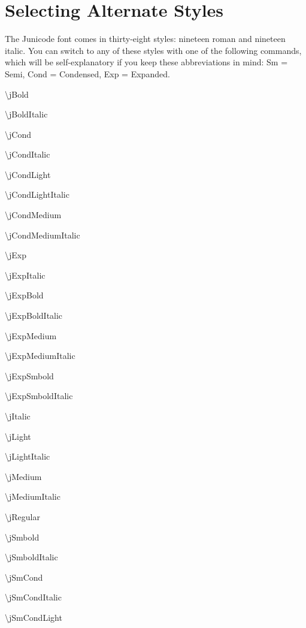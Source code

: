 \documentclass{article}
\begin{document}
\section{Selecting Alternate Styles}

The Junicode font comes in thirty-eight styles: nineteen roman and nineteen italic. You can
switch to any of these styles with one of the following commands, which will be self-explanatory
if you keep these abbreviations in mind: Sm = Semi, Cond = Condensed, Exp = Expanded.

\begin{multicols}{3}
    \jCond\textbackslash jBold

    \textbackslash jBoldItalic
    
    \textbackslash jCond
    
    \textbackslash jCondItalic
    
    \textbackslash jCondLight
    
    \textbackslash jCondLightItalic
    
    \textbackslash jCondMedium
    
    \textbackslash jCondMediumItalic
    
    \textbackslash jExp
    
    \textbackslash jExpItalic
    
    \textbackslash jExpBold
    
    \textbackslash jExpBoldItalic
    
    \textbackslash jExpMedium
    
    \textbackslash jExpMediumItalic
    
    \textbackslash jExpSmbold
    
    \textbackslash jExpSmboldItalic
    
    \textbackslash jItalic
    
    \textbackslash jLight
    
    \textbackslash jLightItalic
    
    \textbackslash jMedium
    
    \textbackslash jMediumItalic
    
    \textbackslash jRegular
    
    \textbackslash jSmbold
    
    \textbackslash jSmboldItalic
    
    \textbackslash jSmCond
    
    \textbackslash jSmCondItalic
    
    \textbackslash jSmCondLight
    

\end{multicols}
\end{document}
